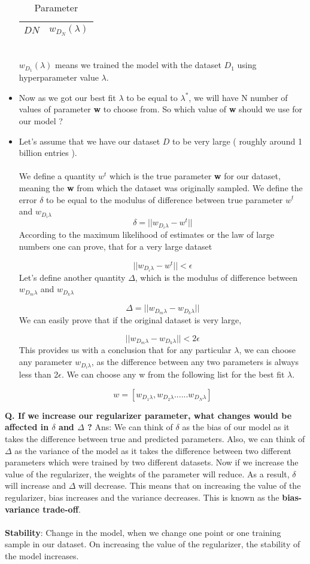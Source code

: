 \documentclass[10pt]{article}
\begin{document}
\begin{itemize}
\begin{table}[ht]
\begin{tabular}{|c|c|}
\hline
$DN$ & $w_{D_N}(\lambda)$\\
\hline
\end{tabular}
\caption{Parameter}
\end{table}\\
 $w_{D_1}(\lambda)$  means we trained the model with the dataset $D_1$ using hyperparameter value $\lambda$.
 \item Now as we got our best fit $\lambda$ to be equal to $\lambda^*$, we will have N number of values of parameter \textbf{w} to choose from. So which value of \textbf{w} should we use for our model ?
\item
Let's assume that we have our dataset $D$ to be very large ( roughly around 1 billion entries ).\\\\
We define a quantity $w^t$ which is the true parameter \textbf{w} for our dataset, meaning the \textbf{w} from which the dataset was originally sampled. We define the error $\delta$ to be equal to the modulus of difference between true parameter $w^t$ and $w_{D_i\lambda}$ 
    $$ \delta = || w_{D_i\lambda} - w^t || $$
\noindent
According to the maximum likelihood of estimates or the law of large numbers one can prove, that for a very large dataset 
    
         $$   || w_{D_i\lambda} - w^t || < \epsilon $$
\noindent
Let's define another quantity $\Delta$, which is the modulus of difference between $w_{D_m\lambda}$ and $w_{D_k\lambda}$

    $$ \Delta = || w_{D_m\lambda} - w_{D_k\lambda}|| $$
\noindent
We can easily prove that if the original dataset is very large,

      $$  || w_{D_m\lambda} - w_{D_k\lambda}|| < 2\epsilon $$    
\noindent
This provides us with a conclusion that for any particular $\lambda$, we can choose any parameter $w_{D_i\lambda}$, as the difference between any two parameters is always less than 2$\epsilon$. We can choose any w from the following list for the best fit $\lambda$.

    $$ w = [w_{D_1\lambda},w_{D_2\lambda} ...... w_{D_N\lambda}] $$
\end{itemize}

\noindent
\textbf{\large{Q. If we increase our regularizer parameter, what changes would be affected in $\delta$ and $\Delta$ ?}}
Ans: We can think of $\delta$ as the bias of our model as it takes the difference between true and predicted parameters. Also, we can think of $\Delta$ as the variance of the model as it takes the difference between two different parameters which were trained by two different datasets.
Now if we increase the value of the regularizer, the weights of the parameter will reduce. As a result, $\delta$ will increase and $\Delta$ will decrease. This means that on increasing the value of the regularizer, bias increases and the variance decreases. This is known as the \textbf{bias-variance trade-off}.
\\
\\
\textbf{Stability}: Change in the model, when we change one point or one training sample in our dataset. On increasing the value of the regularizer, the stability of the model increases.
\end{document}
